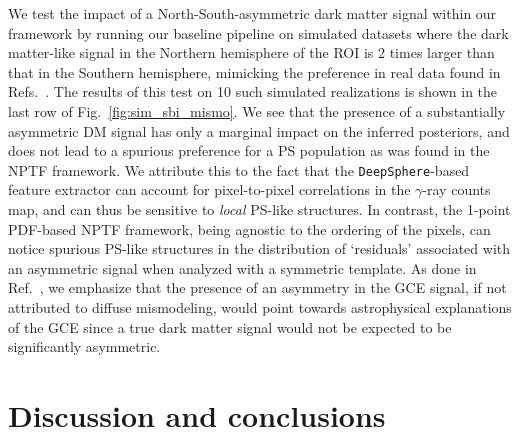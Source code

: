 \documentclass[prd,aps,10pt,nofootinbib,twocolumn,superscriptaddress,preprintnumbers,balancelastpage,longbibliography]{revtex4-1}
\begin{document}
We test the impact of a North-South-asymmetric dark matter signal within our framework by running our baseline pipeline on simulated datasets where the dark matter-like signal in the Northern hemisphere of the ROI is 2 times larger than that in the Southern hemisphere, mimicking the preference in real data found in Refs.~\cite{Leane:2020nmi,Leane:2020pfc}. The results of this test on 10 such simulated realizations is shown in the last row of Fig.~\ref{fig:sim_sbi_mismo}. We see that the presence of a substantially asymmetric DM signal has only a marginal impact on the inferred posteriors, and does not lead to a spurious preference for a PS population as was found in the NPTF framework. We attribute this to the fact that the \texttt{DeepSphere}-based feature extractor can account for pixel-to-pixel correlations in the $\gamma$-ray counts map, and can thus be sensitive to \emph{local} PS-like structures. In contrast, the 1-point PDF-based NPTF framework, being agnostic to the ordering of the pixels, can notice spurious PS-like structures in the distribution of `residuals' associated with an asymmetric signal when analyzed with a symmetric template.
As done in Ref.~\cite{Buschmann:2020adf}, we emphasize that the presence of an asymmetry in the GCE signal, if not attributed to diffuse mismodeling, would point towards astrophysical explanations of the GCE since a true dark matter signal would not be expected to be significantly asymmetric.

\section{Discussion and conclusions}
\label{sec:conclusion}
\end{document}
